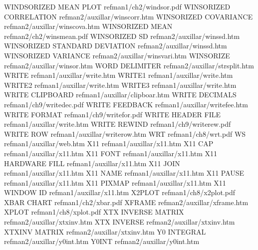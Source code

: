 WINDSORIZED MEAN PLOT                   refman1/ch2/windsor.pdf
WINSORIZED CORRELATION                  refman2/auxillar/winscorr.htm
WINSORIZED COVARIANCE                   refman2/auxillar/winscova.htm
WINSORIZED MEAN                         refman2/ch2/winsmean.pdf
WINSORIZED SD                           refman2/auxillar/winssd.htm
WINSORIZED STANDARD DEVIATION           refman2/auxillar/winssd.htm
WINSORIZED VARIANCE                     refman2/auxillar/winsvari.htm
WINSORIZE                               refman2/auxillar/winsor.htm
WORD DELIMITER                          refman2/auxillar/strsplit.htm
WRITE                                   refman1/auxillar/write.htm
WRITE1                                  refman1/auxillar/write.htm
WRITE2                                  refman1/auxillar/write.htm
WRITE3                                  refman1/auxillar/write.htm
WRITE CLIPBOARD                         refman1/auxillar/clipboar.htm
WRITE DECIMALS                          refman1/ch9/writedec.pdf
WRITE FEEDBACK                          refman1/auxillar/writefee.htm
WRITE FORMAT                            refman1/ch9/writefor.pdf
WRITE HEADER FILE                       refman1/auxillar/write.htm
WRITE REWIND                            refman1/ch9/writerew.pdf
WRITE ROW                               refman1/auxillar/writerow.htm
WRT                                     refman1/ch8/wrt.pdf
WS                                      refman1/auxillar/web.htm
X11                                     refman1/auxillar/x11.htm
X11 CAP                                 refman1/auxillar/x11.htm
X11 FONT                                refman1/auxillar/x11.htm
X11 HARDWARE FILL                       refman1/auxillar/x11.htm
X11 JOIN                                refman1/auxillar/x11.htm
X11 NAME                                refman1/auxillar/x11.htm
X11 PAUSE                               refman1/auxillar/x11.htm
X11 PIXMAP                              refman1/auxillar/x11.htm
X11 WINDOW ID                           refman1/auxillar/x11.htm
X2PLOT                                  refman1/ch8/x2plot.pdf
XBAR CHART                              refman1/ch2/xbar.pdf
XFRAME                                  refman2/auxillar/xframe.htm
XPLOT                                   refman1/ch8/xplot.pdf
XTX INVERSE MATRIX                      refman2/auxillar/xtxinv.htm
XTX INVERSE                             refman2/auxillar/xtxinv.htm
XTXINV MATRIX                           refman2/auxillar/xtxinv.htm
Y0 INTEGRAL                             refman2/auxillar/y0int.htm
Y0INT                                   refman2/auxillar/y0int.htm

